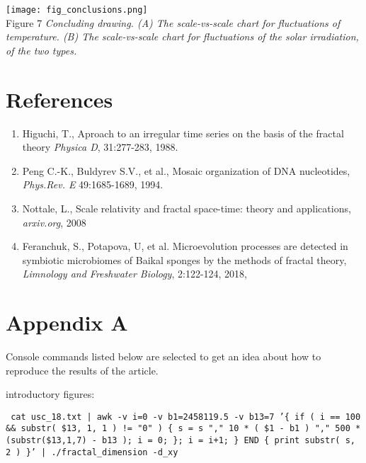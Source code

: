 \documentclass[a4paper]{article}
\begin{document}
\vskip 12pt

\texttt{[image: fig\_conclusions.png]}\\
Figure 7 \textit{Concluding drawing. (A) The scale-vs-scale chart for fluctuations of temperature. (B) The scale-vs-scale chart for fluctuations of the solar irradiation, of the two types.}

\newpage
\section*{References}

\begin{enumerate}

\item Higuchi, T., Aproach to an irregular time series on the basis of the fractal theory \textit{Physica D}, 31:277-283, 1988.

\item Peng C.-K., Buldyrev S.V., et al., Mosaic organization of DNA nucleotides, \textit{Phys.Rev. E} 49:1685-1689, 1994.

\item Nottale, L., Scale relativity and fractal space-time: theory and applications, \textit{arxiv.org}, 2008

\item Feranchuk, S., Potapova, U, et al. Microevolution processes are detected in symbiotic microbiomes of Baikal sponges by the methods of fractal theory, \textit{Limnology and Freshwater Biology}, 2:122-124, 2018,

\end{enumerate}

\newpage

\section*{Appendix A}

Console commands listed below are selected to get an idea about how to reproduce the results of the article.
\vskip 12pt

\noindent
introductory figures:

\texttt{\small{ cat usc\_18.txt | awk -v i=0 -v b1=2458119.5 -v b13=7 '\{ if ( i == 100 \&\& substr( \$13, 1, 1 ) != "0" ) \{ s = s "," 10 * ( \$1 - b1 ) "," 500 * (substr(\$13,1,7) - b13 ); i = 0; \}; i = i+1; \} END \{ print substr( s, 2 ) \}' | ./fractal\_dimension -d\_xy }}

\end{document}
